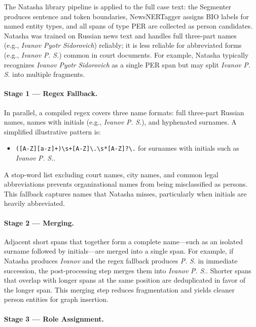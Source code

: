 \documentclass[11pt]{article}
\begin{document}
The Natasha library pipeline is applied to the full case text: the Segmenter produces sentence and token boundaries, NewsNERTagger assigns BIO labels for named entity types, and all spans of type PER are collected as person candidates. Natasha was trained on Russian news text and handles full three-part names (e.g., \textit{Ivanov Pyotr Sidorovich}) reliably; it is less reliable for abbreviated forms (e.g., \textit{Ivanov P. S.}) common in court documents. For example, Natasha typically recognizes \textit{Ivanov Pyotr Sidorovich} as a single PER span but may split \textit{Ivanov P. S.} into multiple fragments.

\paragraph{Stage 1 --- Regex Fallback.}

In parallel, a compiled regex covers three name formats: full three-part Russian names, names with initials (e.g., \textit{Ivanov P. S.}), and hyphenated surnames. A simplified illustrative pattern is:
\begin{itemize}
\item \verb|([A-Z][a-z]+)\s+[A-Z]\.\s*[A-Z]?\.| for surnames with initials such as \textit{Ivanov P. S.}.
\end{itemize}
A stop-word list excluding court names, city names, and common legal abbreviations prevents organizational names from being misclassified as persons. This fallback captures names that Natasha misses, particularly when initials are heavily abbreviated.

\paragraph{Stage 2 --- Merging.}

Adjacent short spans that together form a complete name---such as an isolated surname followed by initials---are merged into a single span. For example, if Natasha produces \textit{Ivanov} and the regex fallback produces \textit{P. S.} in immediate succession, the post-processing step merges them into \textit{Ivanov P. S.}. Shorter spans that overlap with longer spans at the same position are deduplicated in favor of the longer span. This merging step reduces fragmentation and yields cleaner person entities for graph insertion.

\paragraph{Stage 3 --- Role Assignment.}
\end{document}
